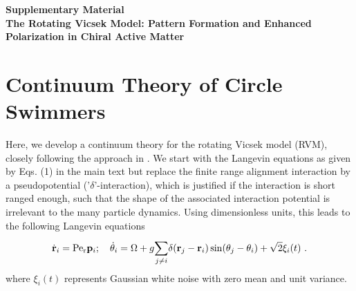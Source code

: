 \documentclass[aps,twocolumn,showlabels,showrefs,amsmath,amssymb,pre,superscriptaddress, floatfix, colors]{revtex4}
\newcommand{\1}{\begin{equation}}
\newcommand{\2}{\end{equation}}
\newcommand{\4}[2]{{\frac{#1}{#2}}}
\newcommand{\Sum}[2]{{\sum\limits_{#1}^{#2}}}
\begin{document}
\begin{center}
{\large \bf Supplementary Material
\vspace{0.4cm}\\The Rotating Vicsek Model: Pattern Formation and Enhanced Polarization in Chiral Active Matter}
\end{center}




\section{Continuum Theory of Circle Swimmers}
Here, we develop a continuum theory for the rotating Vicsek model (RVM), closely following the approach in \cite{Liebchen2016sm}.
We start with the Langevin equations as given by Eqs. (1) in the main text
but
replace the 
finite range alignment interaction by a pseudopotential ('$\delta$'-interaction), which is justified if the 
interaction is short ranged enough, 
such that the shape of the associated interaction potential is irrelevant to the many particle dynamics. Using dimensionless units, this leads to the following Langevin equations
\1
\dot {\bf r}_i = {\rm Pe}_{\rm r} {\bf p}_i; \quad \dot \theta_i = \Omega + g\Sum{j\neq i}{}\delta({\bf r}_j-{\bf r}_i)\sin(\theta_j-\theta_i) + \sqrt{2}\xi_i(t)\ .
\2
where $\xi_i(t)$ represents Gaussian white noise with zero mean and unit variance. 
\end{document}
